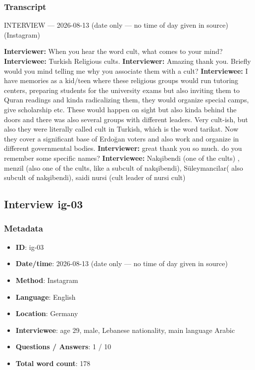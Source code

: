 \subsubsection*{Transcript}
INTERVIEW — 2026-08-13 (date only — no time of day given in source) (Instagram)

\textbf{Interviewer:} When you hear the word cult, what comes to your mind?
\textbf{Interviewee:} Turkish Religious cults.
\textbf{Interviewer:} Amazing thank you. Briefly would you mind telling me why you associate them with a cult?
\textbf{Interviewee:} I have memories as a kid/teen where these religious groups would run tutoring centers, preparing students for the university exams but also inviting them to Quran readings and kinda radicalizing them, they would organize special camps, give scholarship etc. These would happen on sight but also kinda behind the doors and there was also several groups with different leaders. Very cult-ish, but also they were literally called cult in Turkish, which is the word tarikat. Now they cover a significant base of Erdoğan voters and also work and organize in different governmental bodies.
\textbf{Interviewer:} great thank you so much. do you remember some specific names?
\textbf{Interviewee:} Nakşibendi (one of the cults) , menzil (also one of the cults, like a subcult of nakşibendi), Süleymancilar( also subcult of nakşibendi), saidi nursi (cult leader of nursi cult)

\subsection{Interview ig-03}\label{int:ig-03}
\subsubsection*{Metadata}
\begin{itemize}
  \item \textbf{ID}: ig-03
  \item \textbf{Date/time}: 2026-08-13 (date only — no time of day given in source)
  \item \textbf{Method}: Instagram
  \item \textbf{Language}: English
  \item \textbf{Location}: Germany
  \item \textbf{Interviewee}: age 29, male, Lebanese nationality, main language Arabic
  \item \textbf{Questions / Answers}: 1 / 10
  \item \textbf{Total word count}: 178
\end{itemize}
